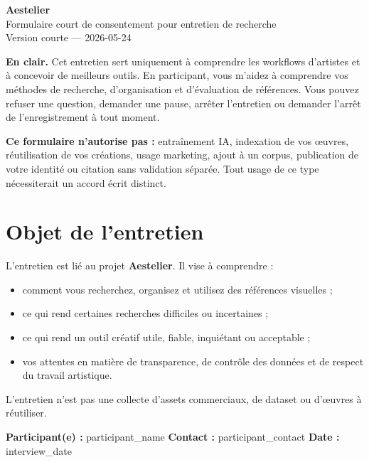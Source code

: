 \documentclass[10pt,a4paper]{article}
\newcommand{\fieldvalue}[2]{\textbf{#1}\hspace{0.4em}#2}
\newcommand{\smallnote}[1]{{\small\color{AestelierMuted}#1}}
\newcommand{\notice}[1]{%
  \begingroup
  \setlength{\fboxsep}{0.6em}%
  \noindent\colorbox{AestelierSoft}{%
    \parbox{\dimexpr\linewidth-2\fboxsep\relax}{#1}%
  }%
  \endgroup
  \par\vspace{0.4em}
}
\begin{document}
\begin{center}
  {\Large\textbf{Aestelier}}\\[0.25em]
  {\normalsize Formulaire court de consentement pour entretien de recherche}\\[0.35em]
  \smallnote{Version courte — 2026-05-24}
\end{center}

\vspace{0.4em}

\notice{%
  \textbf{En clair.} Cet entretien sert uniquement à comprendre les workflows d'artistes et à concevoir de meilleurs outils. En participant, vous m'aidez à comprendre vos méthodes de recherche, d'organisation et d'évaluation de références. Vous pouvez refuser une question, demander une pause, arrêter l'entretien ou demander l'arrêt de l'enregistrement à tout moment.\par
  \vspace{0.35em}
  \textbf{Ce formulaire n'autorise pas :} entraînement IA, indexation de vos œuvres, réutilisation de vos créations, usage marketing, ajout à un corpus, publication de votre identité ou citation sans validation séparée. Tout usage de ce type nécessiterait un accord écrit distinct.
}

\section{Objet de l'entretien}

L'entretien est lié au projet \textbf{Aestelier}. Il vise à comprendre :

\begin{itemize}
  \item comment vous recherchez, organisez et utilisez des références visuelles ;
  \item ce qui rend certaines recherches difficiles ou incertaines ;
  \item ce qui rend un outil créatif utile, fiable, inquiétant ou acceptable ;
  \item vos attentes en matière de transparence, de contrôle des données et de respect du travail artistique.
\end{itemize}

L'entretien n'est pas une collecte d'assets commerciaux, de dataset ou d'œuvres à réutiliser.

\notice{%
  \fieldvalue{Participant(e) :}{ {{participant_name}} }\quad
  \fieldvalue{Contact :}{ {{participant_contact}} }\quad
  \fieldvalue{Date :}{ {{interview_date}} }
}
\end{document}
